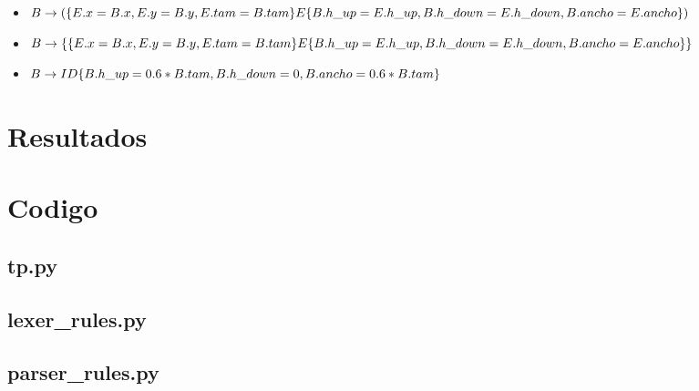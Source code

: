 \documentclass[a4paper, 10pt, twoside]{article}
\begin{document}
\begin{itemize}
  \item $ B \rightarrow ( \{ E.x = B.x, E.y = B.y, E.tam = B.tam \} E \\
                          \{ B.h\_up = E.h\_up, B.h\_down = E.h\_down, B.ancho = E.ancho \} ) \\ $

  \item $ B \rightarrow \{ \{ E.x = B.x, E.y = B.y, E.tam = B.tam \} E \\
                          \{ B.h\_up = E.h\_up, B.h\_down = E.h\_down, B.ancho = E.ancho \} \} \\ $

  \item $ B \rightarrow ID \{ B.h\_up = 0.6 * B.tam, B.h\_down = 0, B.ancho = 0.6 * B.tam \} \\ $  

\end{itemize}

\section{Resultados}
\begin{figure}[h]

\end{figure}

\section{Codigo}


\subsection{tp.py}


\subsection{lexer_rules.py}


\subsection{parser_rules.py}

\end{document}
